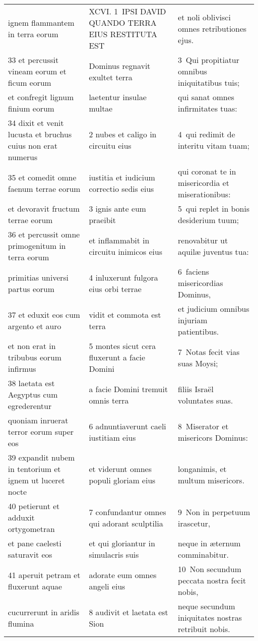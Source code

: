 \documentclass{article}
\begin{document}
\begin{longtable}{@{}p{}p{}p{}@{}}
ignem flammantem in terra eorum	&	XCVI. 1 IPSI DAVID QUANDO TERRA EIUS RESTITUTA EST	&	et noli oblivisci omnes retributiones ejus.	\\
33 et percussit vineam eorum et ficum eorum	&	Dominus regnavit exultet terra	&	3 Qui propitiatur omnibus iniquitatibus tuis;	\\
et confregit lignum finium eorum	&	laetentur insulae multae	&	qui sanat omnes infirmitates tuas:	\\
34 dixit et venit lucusta et bruchus cuius non erat numerus	&	2 nubes et caligo in circuitu eius	&	4 qui redimit de interitu vitam tuam;	\\
35 et comedit omne faenum terrae eorum	&	iustitia et iudicium correctio sedis eius	&	qui coronat te in misericordia et miserationibus:	\\
et devoravit fructum terrae eorum	&	3 ignis ante eum praeibit	&	5 qui replet in bonis desiderium tuum;	\\
36 et percussit omne primogenitum in terra eorum	&	et inflammabit in circuitu inimicos eius	&	renovabitur ut aquilæ juventus tua:	\\
primitias universi partus eorum	&	4 inluxerunt fulgora eius orbi terrae	&	6 faciens misericordias Dominus,	\\
37 et eduxit eos cum argento et auro	&	vidit et commota est terra	&	et judicium omnibus injuriam patientibus.	\\
et non erat in tribubus eorum infirmus	&	5 montes sicut cera fluxerunt a facie Domini	&	7 Notas fecit vias suas Moysi;	\\
38 laetata est Aegyptus cum egrederentur	&	a facie Domini tremuit omnis terra	&	filiis Israël voluntates suas.	\\
quoniam inruerat terror eorum super eos	&	6 adnuntiaverunt caeli iustitiam eius	&	8 Miserator et misericors Dominus:	\\
39 expandit nubem in tentorium et ignem ut luceret nocte	&	et viderunt omnes populi gloriam eius	&	longanimis, et multum misericors.	\\
40 petierunt et adduxit ortygometran	&	7 confundantur omnes qui adorant sculptilia	&	9 Non in perpetuum irascetur,	\\
et pane caelesti saturavit eos	&	et qui gloriantur in simulacris suis	&	neque in æternum comminabitur.	\\
41 aperuit petram et fluxerunt aquae	&	adorate eum omnes angeli eius	&	10 Non secundum peccata nostra fecit nobis,	\\
cucurrerunt in aridis flumina	&	8 audivit et laetata est Sion	&	neque secundum iniquitates nostras retribuit nobis.	\\

\end{longtable}
\end{document}
